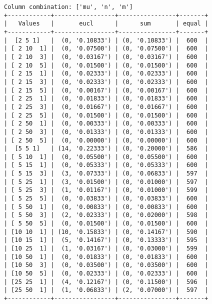 \documentclass{article}
\begin{document}
\begin{verbatim}
Column combination: ['mu', 'n', 'm']
+------------+-----------------+----------------+-------+
|   Values   |       eucl      |      sum       | equal |
+------------+-----------------+----------------+-------+
|  [2 5 1]   |  (0, '0.10833') | (0, '0.10833') |  600  |
| [ 2 10  1] |  (0, '0.07500') | (0, '0.07500') |  600  |
| [ 2 10  3] |  (0, '0.03167') | (0, '0.03167') |  600  |
| [ 2 10  5] |  (0, '0.01500') | (0, '0.01500') |  600  |
| [ 2 15  1] |  (0, '0.02333') | (0, '0.02333') |  600  |
| [ 2 15  3] |  (0, '0.02333') | (0, '0.02333') |  600  |
| [ 2 15  5] |  (0, '0.00167') | (0, '0.00167') |  600  |
| [ 2 25  1] |  (0, '0.01833') | (0, '0.01833') |  600  |
| [ 2 25  3] |  (0, '0.01667') | (0, '0.01667') |  600  |
| [ 2 25  5] |  (0, '0.01500') | (0, '0.01500') |  600  |
| [ 2 50  1] |  (0, '0.00333') | (0, '0.00333') |  600  |
| [ 2 50  3] |  (0, '0.01333') | (0, '0.01333') |  600  |
| [ 2 50  5] |  (0, '0.00000') | (0, '0.00000') |  600  |
|  [5 5 1]   | (14, '0.22333') | (0, '0.20000') |  586  |
| [ 5 10  1] |  (0, '0.05500') | (0, '0.05500') |  600  |
| [ 5 15  1] |  (0, '0.05333') | (0, '0.05333') |  600  |
| [ 5 15  3] |  (3, '0.07333') | (0, '0.06833') |  597  |
| [ 5 25  1] |  (3, '0.01500') | (0, '0.01000') |  597  |
| [ 5 25  3] |  (1, '0.01167') | (0, '0.01000') |  599  |
| [ 5 25  5] |  (0, '0.03833') | (0, '0.03833') |  600  |
| [ 5 50  1] |  (0, '0.00833') | (0, '0.00833') |  600  |
| [ 5 50  3] |  (2, '0.02333') | (0, '0.02000') |  598  |
| [ 5 50  5] |  (0, '0.01500') | (0, '0.01500') |  600  |
| [10 10  1] | (10, '0.15833') | (0, '0.14167') |  590  |
| [10 15  1] |  (5, '0.14167') | (0, '0.13333') |  595  |
| [10 25  1] |  (1, '0.03167') | (0, '0.03000') |  599  |
| [10 50  1] |  (0, '0.01833') | (0, '0.01833') |  600  |
| [10 50  3] |  (0, '0.03500') | (0, '0.03500') |  600  |
| [10 50  5] |  (0, '0.02333') | (0, '0.02333') |  600  |
| [25 25  1] |  (4, '0.12167') | (0, '0.11500') |  596  |
| [25 50  1] |  (1, '0.06833') | (2, '0.07000') |  597  |
+------------+-----------------+----------------+-------+
\end{verbatim}
\end{document}
